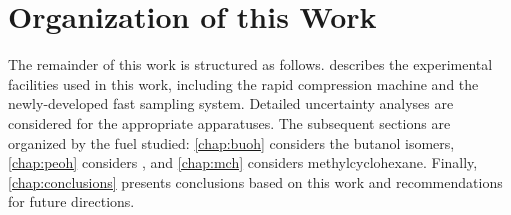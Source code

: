 \documentclass[../main.tex]{subfiles}
\begin{document}
\section{Organization of this Work}

The remainder of this work is structured as follows.
 describes the experimental facilities
used in this work, including the rapid compression machine and the newly-developed
fast sampling system. Detailed uncertainty analyses are considered for the
appropriate apparatuses. The subsequent sections are organized by the fuel
studied: \cref{chap:buoh} considers the butanol isomers, \cref{chap:peoh}
considers \iPeOH{}, and \cref{chap:mch} considers methylcyclohexane.
Finally, \cref{chap:conclusions} presents conclusions based on this work and
recommendations for future directions.
\end{document}
